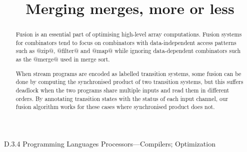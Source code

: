 \documentclass[preprint]{sigplanconf}
\begin{document}
\doi{}

\title{Merging merges, more or less}



\maketitle
\makeatactive

\begin{abstract}
Fusion is an essential part of optimising high-level array computations.
Fusion systems for combinators tend to focus on combinators with data-independent access patterns such as @zip@, @filter@ and @map@ while ignoring data-dependent combinators such as the @merge@ used in merge sort.

When stream programs are encoded as labelled transition systems, some fusion can be done by computing the synchronised product of two transition systems, but this suffers deadlock when the two programs share multiple inputs and read them in different orders.
By annotating transition states with the status of each input channel, our fusion algorithm works for these cases where synchronised product does not.
\end{abstract}


\category
	{D.3.4}
	{Programming Languages}
	{Processors---Compilers; Optimization}







\end{document}
